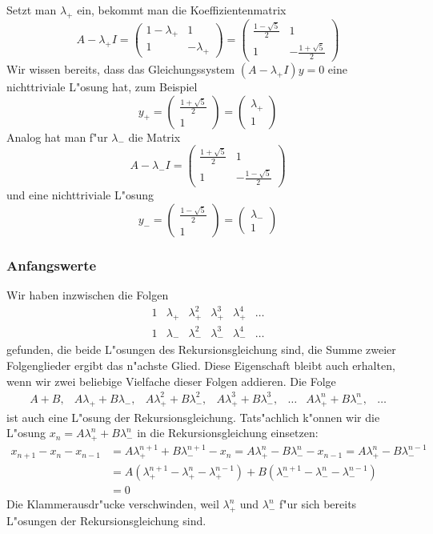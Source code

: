 Setzt man $\lambda_+$ ein, bekommt man die Koeffizientenmatrix
\[
A-\lambda_+I=
\begin{pmatrix}
1-\lambda_+&1\\1&-\lambda_+
\end{pmatrix}
=
\begin{pmatrix}
\frac{1-\sqrt{5}}2&1\\1&-\frac{1+\sqrt{5}}2
\end{pmatrix}
\]
Wir wissen bereits, dass das Gleichungssystem $(A-\lambda_+I)y=0$
eine nichttriviale L"osung hat, zum Beispiel
\[
y_+=\begin{pmatrix}
\frac{1+\sqrt{5}}2\\1
\end{pmatrix}
=\begin{pmatrix}
\lambda_+\\1
\end{pmatrix}
\]
Analog hat man f"ur $\lambda_-$ die Matrix
\[
A-\lambda_-I=
\begin{pmatrix}
\frac{1+\sqrt{5}}2&1\\
1&-\frac{1-\sqrt{5}}2
\end{pmatrix}
\]
und eine nichttriviale L"osung 
\[
y_-=\begin{pmatrix}
\frac{1-\sqrt{5}}2\\
1
\end{pmatrix}=
\begin{pmatrix}
\lambda_-\\1
\end{pmatrix}
\]
\subsubsection{Anfangswerte}
Wir haben inzwischen die Folgen
\[
\begin{matrix}
1&\lambda_+&\lambda_+^2&\lambda_+^3&\lambda_+^4&\dots\\
1&\lambda_-&\lambda_-^2&\lambda_-^3&\lambda_-^4&\dots
\end{matrix}
\]
gefunden, die beide L"osungen des Rekursionsgleichung sind, die Summe
zweier Folgenglieder ergibt das n"achste Glied.
Diese Eigenschaft bleibt auch erhalten, wenn wir zwei beliebige
Vielfache dieser Folgen addieren.
Die Folge
\[
\begin{matrix}
A+B,
&A\lambda_++B\lambda_-,
&A\lambda_+^2+B\lambda_-^2,
&A\lambda_+^3+B\lambda_-^3,
&\dots
&A\lambda_+^n+B\lambda_-^n,
&\dots
\end{matrix}
\]
ist auch eine L"osung der Rekursionsgleichung.
Tats"achlich k"onnen
wir die L"osung
$x_n=A\lambda_+^n + B\lambda_-^n$
in die Rekursionsgleichung einsetzen:
\begin{align*}
x_{n+1}-x_n-x_{n-1}
&=A\lambda_+^{n+1} + B\lambda_-^{n+1}
-x_n=A\lambda_+^n - B\lambda_-^n
-x_{n-1}=A\lambda_+^n - B\lambda_-^{n-1}
\\
&=
A(\lambda_+^{n+1}-\lambda_+^n-\lambda_+^{n-1})
+
B(\lambda_-^{n+1}-\lambda_-^n-\lambda_-^{n-1})
\\
&=0
\end{align*}
Die Klammerausdr"ucke verschwinden, weil $\lambda_+^n$ und $\lambda_-^n$
f"ur sich bereits L"osungen der Rekursionsgleichung sind.

